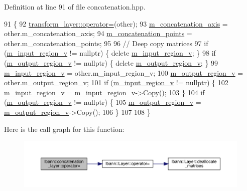 Definition at line 91 of file concatenation.\+hpp.


\begin{DoxyCode}
91                                                                    \{
92     \hyperlink{classlbann_1_1Layer_a00d8acde68fda2f38c4a39ef8c89234a}{transform\_layer::operator=}(other);
93     \hyperlink{classlbann_1_1concatenation__layer_a4ac4a931dc85d622e9ea8fddb9625d38}{m\_concatenation\_axis} = other.m\_concatenation\_axis;
94     \hyperlink{classlbann_1_1concatenation__layer_a363324fe6cd104740334f3396085328c}{m\_concatenation\_points} = other.m\_concatenation\_points;
95 
96     \textcolor{comment}{// Deep copy matrices}
97     \textcolor{keywordflow}{if} (\hyperlink{classlbann_1_1concatenation__layer_afa68f2e5d3ea2de57f4974a37c01fc7b}{m\_input\_region\_v} != \textcolor{keyword}{nullptr})  \{ \textcolor{keyword}{delete} \hyperlink{classlbann_1_1concatenation__layer_afa68f2e5d3ea2de57f4974a37c01fc7b}{m\_input\_region\_v}; \}
98     \textcolor{keywordflow}{if} (\hyperlink{classlbann_1_1concatenation__layer_af141bf9cf1569121a65a68e4ae97855c}{m\_output\_region\_v} != \textcolor{keyword}{nullptr}) \{ \textcolor{keyword}{delete} 
      \hyperlink{classlbann_1_1concatenation__layer_af141bf9cf1569121a65a68e4ae97855c}{m\_output\_region\_v}; \}
99     \hyperlink{classlbann_1_1concatenation__layer_afa68f2e5d3ea2de57f4974a37c01fc7b}{m\_input\_region\_v} = other.m\_input\_region\_v;
100     \hyperlink{classlbann_1_1concatenation__layer_af141bf9cf1569121a65a68e4ae97855c}{m\_output\_region\_v} = other.m\_output\_region\_v;
101     \textcolor{keywordflow}{if} (\hyperlink{classlbann_1_1concatenation__layer_afa68f2e5d3ea2de57f4974a37c01fc7b}{m\_input\_region\_v} != \textcolor{keyword}{nullptr}) \{
102       \hyperlink{classlbann_1_1concatenation__layer_afa68f2e5d3ea2de57f4974a37c01fc7b}{m\_input\_region\_v} = \hyperlink{classlbann_1_1concatenation__layer_afa68f2e5d3ea2de57f4974a37c01fc7b}{m\_input\_region\_v}->Copy();
103     \}
104     \textcolor{keywordflow}{if} (\hyperlink{classlbann_1_1concatenation__layer_af141bf9cf1569121a65a68e4ae97855c}{m\_output\_region\_v} != \textcolor{keyword}{nullptr}) \{
105       \hyperlink{classlbann_1_1concatenation__layer_af141bf9cf1569121a65a68e4ae97855c}{m\_output\_region\_v} = \hyperlink{classlbann_1_1concatenation__layer_af141bf9cf1569121a65a68e4ae97855c}{m\_output\_region\_v}->Copy();
106     \}
107 
108   \}
\end{DoxyCode}
Here is the call graph for this function\+:\nopagebreak
\begin{figure}[H]
\begin{center}
\leavevmode
\includegraphics[width=350pt]{classlbann_1_1concatenation__layer_af91f0850e13dd854e095f2c9d00d58b2_cgraph}
\end{center}
\end{figure}
